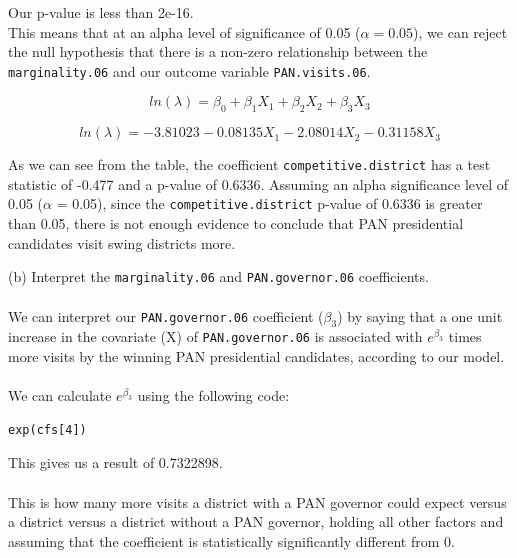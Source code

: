 \documentclass[12pt,letterpaper]{article}
\begin{document}
\noindent Our p-value is less than 2e-16. 
\\

\noindent This means that at an alpha level of significance of 0.05 ($\alpha = 0.05$), we can reject the null hypothesis that there is a non-zero relationship between the \texttt{marginality.06} and our outcome variable \texttt{PAN.visits.06}.

\begin{equation}
ln(\lambda) = \beta_0 + \beta_1X_1 + \beta_2X_2 + \beta_3X_3
\end{equation}

\begin{equation}
ln(\lambda) = -3.81023 - 0.08135X_1 - 2.08014X_2- 0.31158X_3
\end{equation}

\noindent As we can see from the table, the coefficient \texttt{competitive.district} has a test statistic of -0.477 and a p-value of 0.6336. Assuming an alpha significance level of 0.05 ($\alpha$ = 0.05), since the \texttt{competitive.district} p-value of 0.6336 is greater than 0.05, there is not enough evidence to conclude that PAN presidential candidates visit swing districts more.




\pagebreak

\noindent (b) Interpret the \texttt{marginality.06} and \texttt{PAN.governor.06} coefficients.
\\\\

\noindent We can interpret our \texttt{PAN.governor.06} coefficient ($\beta_3$) by saying that a one unit increase in the covariate (X) of \texttt{PAN.governor.06} is associated with $e^{\beta_3}$ times more visits by the winning PAN presidential candidates, according to our model. 
\\\\
\noindent We can calculate $e^{\beta_3}$ using the following code:
\begin{lstlisting}
exp(cfs[4])
\end{lstlisting}

\noindent This gives us a result of 0.7322898.
\\\\
This is how many more visits a district with a PAN governor could expect versus a district versus a district without a PAN governor, holding all other factors and assuming that the coefficient is statistically significantly different from 0.
\\\\
\end{document}
